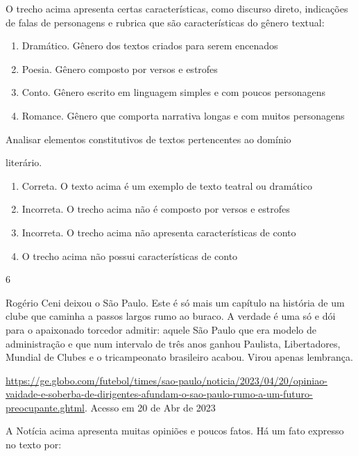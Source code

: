 {{\begin{itemize}
\begin{itemize}
O trecho acima apresenta certas características, como discurso direto,
indicações de falas de personagens e rubrica que são características do
gênero textual:

\begin{enumerate}
\def\labelenumi{\alph{enumi})}
\item
  Dramático. Gênero dos textos criados para serem encenados
\item
  Poesia. Gênero composto por versos e estrofes
\item
  Conto. Gênero escrito em linguagem simples e com poucos personagens
\item
  Romance. Gênero que comporta narrativa longas e com muitos personagens
\end{enumerate}

Analisar elementos constitutivos de textos pertencentes ao domínio

literário.

\begin{enumerate}
\def\labelenumi{\arabic{enumi}.}
\item
  Correta. O texto acima é um exemplo de texto teatral ou dramático
\item
  Incorreta. O trecho acima não é composto por versos e estrofes
\item
  Incorreta. O trecho acima não apresenta características de conto
\item
  O trecho acima não possui características de conto
\end{enumerate}

\num{6}

Rogério Ceni deixou o São Paulo. Este é só mais um capítulo na história
de um clube que caminha a passos largos rumo ao buraco. A verdade é uma
só e dói para o apaixonado torcedor admitir: aquele São Paulo que era
modelo de administração e que num intervalo de três anos ganhou
Paulista, Libertadores, Mundial de Clubes e o tricampeonato brasileiro
acabou. Virou apenas lembrança.

\href{https://ge.globo.com/futebol/times/sao-paulo/noticia/2023/04/20/opiniao-vaidade-e-soberba-de-dirigentes-afundam-o-sao-paulo-rumo-a-um-futuro-preocupante.ghtml}{\uline{https://ge.globo.com/futebol/times/sao-paulo/noticia/2023/04/20/opiniao-vaidade-e-soberba-de-dirigentes-afundam-o-sao-paulo-rumo-a-um-futuro-preocupante.ghtml}}.
Acesso em 20 de Abr de 2023

A Notícia acima apresenta muitas opiniões e poucos fatos. Há um fato
expresso no texto por:


\end{itemize}
\end{itemize}}}
